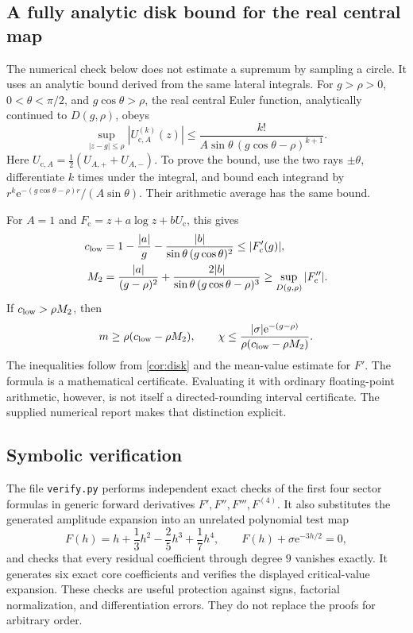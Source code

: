 \documentclass[11pt,a4paper]{article}
\numberwithin{equation}{section}
\theoremstyle{definition}
\theoremstyle{remark}
\newcommand{\e}{\mathrm e}
\newcommand{\cF}{F_{\mathrm c}}
\newcommand{\cU}{U_{\mathrm c}}
\begin{document}
\subsection{A fully analytic disk bound for the real central map}
The numerical check below does not estimate a supremum by sampling a circle. It uses an analytic bound derived from the same lateral integrals. For $g>\rho>0$, $0<\theta<\pi/2$, and $g\cos\theta>\rho$, the real central Euler function, analytically continued to $D(g,\rho)$, obeys
\begin{equation}
 \sup_{|z-g|\leq\rho}|U_{\mathrm c,A}^{(k)}(z)|
 \leq\frac{k!}{A\sin\theta\,(g\cos\theta-\rho)^{k+1}}.
 \label{eq:derivative-integral-bound}
\end{equation}
Here $U_{\mathrm c,A}=\tfrac12(U_{A,+}+U_{A,-})$. To prove the bound, use the two rays $\pm\theta$, differentiate $k$ times under the integral, and bound each integrand by
$r^k\e^{-(g\cos\theta-\rho)r}/(A\sin\theta)$. Their arithmetic average has the same bound.

For $A=1$ and $\cF=z+a\log z+b\cU$, this gives
\begin{align}
 c_{\rm low}&=1-\frac{|a|}{g}
 -\frac{|b|}{\sin\theta\,(g\cos\theta)^2}\leq|\cF'(g)|,\notag\\
 M_2&=\frac{|a|}{(g-\rho)^2}
 +\frac{2|b|}{\sin\theta\,(g\cos\theta-\rho)^3}
 \geq\sup_{D(g,\rho)}|\cF''|.\label{eq:computable-bound}
\end{align}
If $c_{\rm low}>\rho M_2$, then
\begin{equation}
 m\geq\rho(c_{\rm low}-\rho M_2),\qquad
 \chi\leq\frac{|\sigma|\e^{-(g-\rho)}}
                    {\rho(c_{\rm low}-\rho M_2)}.
 \label{eq:numeric-certificate}
\end{equation}
The inequalities follow from \cref{cor:disk} and the mean-value estimate for $F'$. The formula is a mathematical certificate. Evaluating it with ordinary floating-point arithmetic, however, is not itself a directed-rounding interval certificate. The supplied numerical report makes that distinction explicit.

\subsection{Symbolic verification}
The file \texttt{verify.py} performs independent exact checks of the first four sector formulas in generic forward derivatives $F',F'',F''',F^{(4)}$. It also substitutes the generated amplitude expansion into an unrelated polynomial test map
\[
 F(h)=h+\frac13h^2-\frac25h^3+\frac17h^4,
 \qquad F(h)+\sigma\e^{-3h/2}=0,
\]
and checks that every residual coefficient through degree $9$ vanishes exactly. It generates six exact core coefficients and verifies the displayed critical-value expansion. These checks are useful protection against signs, factorial normalization, and differentiation errors. They do not replace the proofs for arbitrary order.
\end{document}
